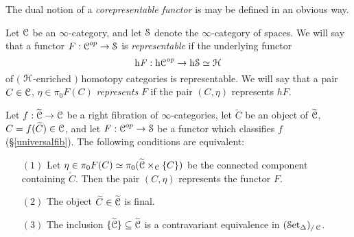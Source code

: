 \begin{remark}
The dual notion of a {\it corepresentable functor} is may be defined in an obvious way.
\end{remark}

\begin{definition}
Let $\operatorname{\mathcal{C}}$ be an $\infty$-category, and let $\operatorname{\mathcal{S}}$ denote the $\infty$-category of spaces.
We will say that a functor $F: \operatorname{\mathcal{C}}^{op} \rightarrow \operatorname{\mathcal{S}}$ is {\it representable} if
the underlying functor
$$ \rm{h} \it{F}: \rm{h} \it{\operatorname{\mathcal{C}}}^{op} \rightarrow \rm{h} \it{\operatorname{\mathcal{S}}} \simeq \operatorname{\mathcal{H}}$$
of $($ $\operatorname{\mathcal{H}}$-enriched $)$ homotopy categories is representable. We will say that a pair
$C \in \operatorname{\mathcal{C}}$, $\eta \in \pi_0 F(C)$ {\it represents} $F$ if the pair $(C,\eta)$ represents
$h F$. 
\end{definition}

\begin{proposition}\label{reppfunc}
Let $f: \widetilde{\operatorname{\mathcal{C}}} \rightarrow \operatorname{\mathcal{C}}$ be a right fibration of $\infty$-categories, let
$\widetilde{C}$ be an object of $\widetilde{\operatorname{\mathcal{C}}}$, $C = f(\widetilde{C}) \in \operatorname{\mathcal{C}}$, and let
$F: \operatorname{\mathcal{C}}^{op} \rightarrow \operatorname{\mathcal{S}}$ be a functor which classifies $f$ (\S \ref{universalfib}).
The following conditions are equivalent:
\begin{itemize}
\item[$(1)$] Let $\eta \in \pi_0 F(C) \simeq \pi_0 
( \widetilde{\operatorname{\mathcal{C}}} \times_{\operatorname{\mathcal{C}}} \{C\} )$ be the connected component containing
$\widetilde{C}$. Then the pair $(C, \eta)$ represents the functor $F$. 

\item[$(2)$] The object $\widetilde{C} \in \widetilde{\operatorname{\mathcal{C}}}$ is final.

\item[$(3)$] The inclusion $\{ \widetilde{\operatorname{\mathcal{C}}} \} \subseteq \widetilde{\operatorname{\mathcal{C}}}$ is a contravariant equivalence in $(\operatorname{\mathcal{S}et_{\Delta}})_{/\operatorname{\mathcal{C}}}$. 
\end{itemize}
\end{proposition}


